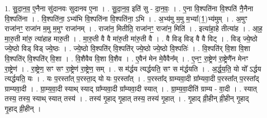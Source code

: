 \documentclass[17pt]{extarticle}
\begin{document}
1. सु॒दा॒न॒व॒ ए॒नैना सु॑दानवः सुदानव ए॒ना । . सु॒दा॒न॒व॒ इति॑ सु - दा॒न॒वः॒ । . ए॒ना वि॒श्पति॑ना वि॒श्पति॑ नै॒नैना वि॒श्पति॑ना । . वि॒श्पति॑ना॒ ऽभ्य॑भि वि॒श्पति॑ना वि॒श्पति॑ना॒ ऽभि । . अ॒भ्य॑मु म॒मु म॒भ्या᳚(1॒)भ्य॑मुम् । . अ॒मुꣳ राजा॑नꣳ॒॒ राजा॑न म॒मु म॒मुꣳ राजा॑नम् । . राजा॑न॒ मितीति॒ राजा॑नꣳ॒॒ राजा॑न॒ मिति॑ । . इत्या॑हा॒हे तीत्या॑ह । . आ॒ह॒ मा॒रु॒ती मा॑रु॒ त्या॑हाह मारु॒ती । . मा॒रु॒ती वै वै मा॑रु॒ती मा॑रु॒ती वै । . वै विड् विड् वै वै विट् । . विड् ज्ये॒ष्ठो ज्ये॒ष्ठो विड् विड् ज्ये॒ष्ठः । . ज्ये॒ष्ठो वि॒श्पति॑र् वि॒श्पति॑र् ज्ये॒ष्ठो ज्ये॒ष्ठो वि॒श्पतिः॑ । . वि॒श्पति॑र् वि॒शा वि॒शा वि॒श्पति॑र् वि॒श्पति॑र् वि॒शा । . वि॒शैवैव वि॒शा वि॒शैव । . ए॒वैन॑ मेन मे॒वैवैन᳚म् । . ए॒नꣳ॒॒ रा॒ष्ट्रेण॑ रा॒ष्ट्रेणै॑न मेनꣳ रा॒ष्ट्रेण॑ । . रा॒ष्ट्रेण॒ सꣳ सꣳ रा॒ष्ट्रेण॑ रा॒ष्ट्रेण॒ सम् । . स म॑र्द्धय त्यर्द्धयति॒ सꣳ स म॑र्द्धयति । . अ॒र्द्ध॒य॒ति॒ यो यो᳚ ऽर्द्धय त्यर्द्धयति॒ यः । . यः प॒रस्ता᳚त् प॒रस्ता॒द् यो यः प॒रस्ता᳚त् । . प॒रस्ता᳚द् ग्राम्यवा॒दी ग्रा᳚म्यवा॒दी प॒रस्ता᳚त् प॒रस्ता᳚द् ग्राम्यवा॒दी । . ग्रा॒म्य॒वा॒दी स्याथ् स्याद् ग्रा᳚म्यवा॒दी ग्रा᳚म्यवा॒दी स्यात् । . ग्रा॒म्य॒वा॒दीति॑ ग्राम्य - वा॒दी । . स्यात् तस्य॒ तस्य॒ स्याथ् स्यात् तस्य॑ । . तस्य॑ गृ॒हाद् गृ॒हात् तस्य॒ तस्य॑ गृ॒हात् । . गृ॒हाद् व्री॒हीन् व्री॒हीन् गृ॒हाद् गृ॒हाद् व्री॒हीन् । \newline
\end{document}
